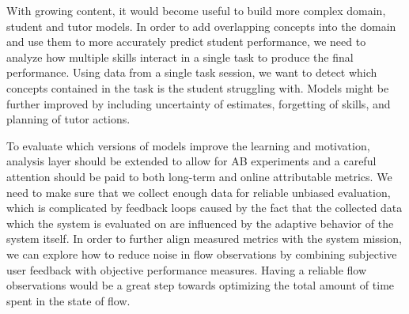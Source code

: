 With growing content, it would become useful to build more complex
domain, student and tutor models. In order to add overlapping concepts
into the domain and use them to more accurately predict student performance,
we need to analyze how multiple skills interact in a single
task to produce the final performance. %
Using data from a single task session,
we want to detect which concepts contained in the task
is the student struggling with.
Models might be further improved by including uncertainty of estimates,
forgetting of skills, and planning of tutor actions.

To evaluate which versions of models improve the learning and motivation, %
analysis layer should be extended to allow for AB experiments
and a careful attention should be paid to both long-term and
online attributable metrics.
We need to make sure that we collect enough data for reliable unbiased evaluation,
which is complicated by feedback loops caused by the fact that
the collected data which the system is evaluated on are influenced by the
adaptive behavior of the system itself.
In order to further align measured metrics with the system mission,
we can explore how to reduce noise in flow observations
by combining subjective user feedback with objective performance measures.
Having a reliable flow observations would be a great step towards optimizing
the total amount of time spent in the state of flow.


